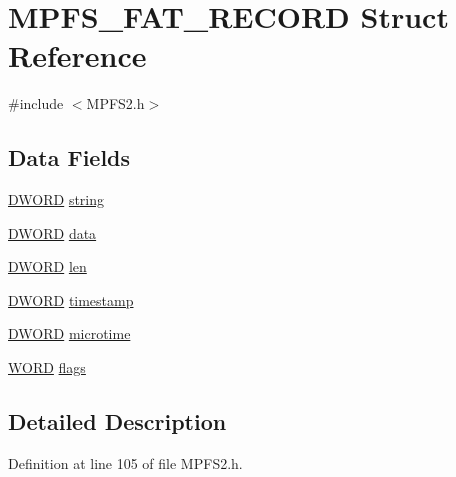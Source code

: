 \hypertarget{struct_m_p_f_s___f_a_t___r_e_c_o_r_d}{}\section{M\+P\+F\+S\+\_\+\+F\+A\+T\+\_\+\+R\+E\+C\+O\+R\+D Struct Reference}
\label{struct_m_p_f_s___f_a_t___r_e_c_o_r_d}


{\ttfamily \#include $<$M\+P\+F\+S2.\+h$>$}

\subsection*{Data Fields}
\begin{DoxyCompactItemize}
\item 
\hyperlink{_generic_type_defs_8h_ad342ac907eb044443153a22f964bf0af}{D\+W\+O\+R\+D} \hyperlink{struct_m_p_f_s___f_a_t___r_e_c_o_r_d_a89ac7b643195c925b1d4225ae4beea7d}{string}
\item 
\hyperlink{_generic_type_defs_8h_ad342ac907eb044443153a22f964bf0af}{D\+W\+O\+R\+D} \hyperlink{struct_m_p_f_s___f_a_t___r_e_c_o_r_d_a93725455c265ad9e4e156050f329ee97}{data}
\item 
\hyperlink{_generic_type_defs_8h_ad342ac907eb044443153a22f964bf0af}{D\+W\+O\+R\+D} \hyperlink{struct_m_p_f_s___f_a_t___r_e_c_o_r_d_a6912002753b0f3e17bdedf65b10a7489}{len}
\item 
\hyperlink{_generic_type_defs_8h_ad342ac907eb044443153a22f964bf0af}{D\+W\+O\+R\+D} \hyperlink{struct_m_p_f_s___f_a_t___r_e_c_o_r_d_af4114d4e251326ebdb4638a0bb418bd7}{timestamp}
\item 
\hyperlink{_generic_type_defs_8h_ad342ac907eb044443153a22f964bf0af}{D\+W\+O\+R\+D} \hyperlink{struct_m_p_f_s___f_a_t___r_e_c_o_r_d_a413338025f9c8bc53b9287c0871bdff3}{microtime}
\item 
\hyperlink{_generic_type_defs_8h_a2b0e863dadf920709ec53d9088ee7c91}{W\+O\+R\+D} \hyperlink{struct_m_p_f_s___f_a_t___r_e_c_o_r_d_aa5250ff1f63a5d1730bc299c7a96b6af}{flags}
\end{DoxyCompactItemize}


\subsection{Detailed Description}


Definition at line 105 of file M\+P\+F\+S2.\+h.



